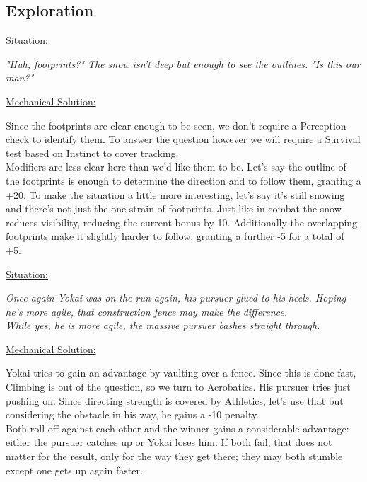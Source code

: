 \documentclass[12pt,a4paper,openany]{book}
\begin{document}
	\subsection*{Exploration}
	\ul{Situation:}
	\begin{exampleblock}
		\textit{"Huh, footprints?" The snow isn't deep but enough to see the outlines. "Is this our man?"}
	\end{exampleblock}
	\ul{Mechanical Solution:}
	\begin{exampleblock}
		Since the footprints are clear enough to be seen, we don't require a Perception check to identify them. To answer the question however we will require a Survival test based on Instinct to cover tracking.\\
		Modifiers are less clear here than we'd like them to be. Let's say the outline of the footprints is enough to determine the direction and to follow them, granting a +20. To make the situation a little more interesting, let's say it's still snowing and there's not just the one strain of footprints. Just like in combat the snow reduces visibility, reducing the current bonus by 10. Additionally the overlapping footprints make it slightly harder to follow, granting a further -5 for a total of +5.
	\end{exampleblock}
	\breakline
	\ul{Situation:}
	\begin{exampleblock}
		\textit{Once again Yokai was on the run again, his pursuer glued to his heels. Hoping he's more agile, that construction fence may make the difference.\\
		While yes, he is more agile, the massive pursuer bashes straight through.}
	\end{exampleblock}
	\ul{Mechanical Solution:}
	\begin{exampleblock}
		Yokai tries to gain an advantage by vaulting over a fence. Since this is done fast, Climbing is out of the question, so we turn to Acrobatics. His pursuer tries just pushing on. Since directing strength is covered by Athletics, let's use that but considering the obstacle in his way, he gains a -10 penalty.\\
		Both roll off against each other and the winner gains a considerable advantage: either the pursuer catches up or Yokai loses him. If both fail, that does not matter for the result, only for the way they get there; they may both stumble except one gets up again faster.
	\end{exampleblock}
\end{document}
